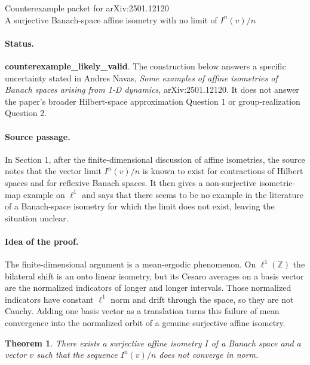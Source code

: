 \documentclass[11pt]{article}
\newtheorem*{theorem}{Theorem}
\begin{document}
\begin{center}
{\Large Counterexample packet for arXiv:2501.12120}\\[4pt]
{\large A surjective Banach-space affine isometry with no limit of $I^n(v)/n$}
\end{center}

\paragraph{Status.}
\textbf{counterexample\_likely\_valid}.  The construction below answers a
specific uncertainty stated in Andres Navas, \emph{Some examples of affine
isometries of Banach spaces arising from 1-D dynamics}, arXiv:2501.12120.  It
does not answer the paper's broader Hilbert-space approximation Question 1 or
group-realization Question 2.

\paragraph{Source passage.}
In Section 1, after the finite-dimensional discussion of affine isometries,
the source notes that the vector limit $I^n(v)/n$ is known to exist for
contractions of Hilbert spaces and for reflexive Banach spaces.  It then gives
a non-surjective isometric-map example on $\ell^1$ and says that there seems to
be no example in the literature of a Banach-space isometry for which the limit
does not exist, leaving the situation unclear.

\paragraph{Idea of the proof.}
The finite-dimensional argument is a mean-ergodic phenomenon.  On
$\ell^1(\mathbb Z)$ the bilateral shift is an onto linear isometry, but its
Cesaro averages on a basis vector are the normalized indicators of longer and
longer intervals.  Those normalized indicators have constant $\ell^1$ norm
and drift through the space, so they are not Cauchy.  Adding one basis vector
as a translation turns this failure of mean convergence into the normalized
orbit of a genuine surjective affine isometry.

\begin{theorem}
There exists a surjective affine isometry $I$ of a Banach space and a vector
$v$ such that the sequence $I^n(v)/n$ does not converge in norm.
\end{theorem}
\end{document}

